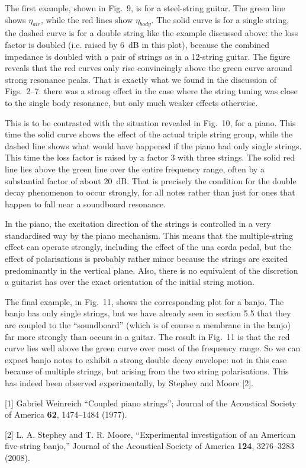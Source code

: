   The first example, shown in Fig.\ 9, is for a steel-string guitar. The green 
  line shows $\eta_{air}$, while the red lines show $\eta_{body}$. The solid 
  curve is for a single string, the dashed curve is for a double string like 
  the example discussed above: the loss factor is doubled (i.e. raised by 6~dB 
  in this plot), because the combined impedance is doubled with a pair of 
  strings as in a 12-string guitar. The figure reveals that the red curves only 
  rise convincingly above the green curve around strong resonance peaks. That 
  is exactly what we found in the discussion of Figs.\ 2--7: there was a strong 
  effect in the case where the string tuning was close to the single body 
  resonance, but only much weaker effects otherwise. 

  This is to be contrasted with the situation revealed in Fig.\ 10, for a 
  piano. This time the solid curve shows the effect of the actual triple string 
  group, while the dashed line shows what would have happened if the piano had 
  only single strings. This time the loss factor is raised by a factor 3 with 
  three strings. The solid red line lies above the green line over the entire 
  frequency range, often by a substantial factor of about 20~dB. That is 
  precisely the condition for the double decay phenomenon to occur strongly, 
  for all notes rather than just for ones that happen to fall near a soundboard 
  resonance. 

  In the piano, the excitation direction of the strings is controlled in a very 
  standardised way by the piano mechanism. This means that the multiple-string 
  effect can operate strongly, including the effect of the una corda pedal, but 
  the effect of polarisations is probably rather minor because the strings are 
  excited predominantly in the vertical plane. Also, there is no equivalent of 
  the discretion a guitarist has over the exact orientation of the initial 
  string motion. 

  The final example, in Fig.\ 11, shows the corresponding plot for a banjo. The 
  banjo has only single strings, but we have already seen in section 5.5 that 
  they are coupled to the ``soundboard'' (which is of course a membrane in the 
  banjo) far more strongly than occurs in a guitar. The result in Fig.\ 11 is 
  that the red curve lies well above the green curve over most of the frequency 
  range. So we can expect banjo notes to exhibit a strong double decay 
  envelope: not in this case because of multiple strings, but arising from the 
  two string polarisations. This has indeed been observed experimentally, by 
  Stephey and Moore [2]. 



  \sectionreferences{}[1] Gabriel Weinreich ``Coupled piano strings''; Journal 
  of the Acoustical Society of America \textbf{62}, 1474--1484 (1977). 

  [2] L. A. Stephey and T. R. Moore, “Experimental investigation of an American 
  five-string banjo,” Journal of the Acoustical Society of America 
  \textbf{124}, 3276--3283 (2008). 